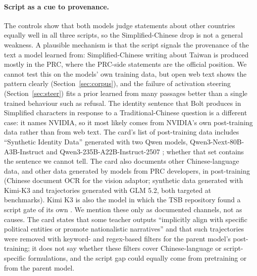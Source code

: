 \documentclass[11pt,a4paper]{article}
\begin{document}
\paragraph{Script as a cue to provenance.}
The controls show that both models judge statements about other countries equally well in all three scripts, so the
Simplified-Chinese drop is not a general weakness. A plausible mechanism is that the script signals the provenance of
the text a model learned from: Simplified-Chinese writing about Taiwan is produced mostly in the PRC, where the PRC-side
statements are the official position. We cannot test this on the models' own training data, but open web text shows
the pattern clearly (Section~\ref{sec:corpus}), and the failure of activation steering (Section~\ref{sec:steer}) fits a
prior learned from many passages better than a single trained behaviour such as refusal. The identity sentence that
Bolt produces in Simplified characters in response to a Traditional-Chinese question is a different case: it names
NVIDIA, so it most likely comes from NVIDIA's own post-training data rather than from web text. The card's list of
post-training data includes ``Synthetic Identity Data'' generated with two Qwen models, Qwen3-Next-80B-A3B-Instruct and
Qwen3-235B-A22B-Instruct-2507 \citep{nvidia2026bolt}; whether that set contains the sentence we cannot tell. The card
also documents other Chinese-language data, and other data generated by models from PRC developers, in post-training
(Chinese document OCR for the vision adaptor; synthetic data generated with Kimi-K3 and trajectories generated with
GLM 5.2, both targeted at benchmarks). Kimi K3 is also the model in which the TSB repository found a script gate of
its own \citep{hsiaoa2026tsb}. We mention these only as documented channels, not as causes. The card states that some
teacher outputs ``implicitly align with specific political entities or promote nationalistic narratives'' and that
such trajectories were removed with keyword- and regex-based filters for the parent model's post-training; it does
not say whether these filters cover Chinese-language or script-specific formulations, and the script gap could
equally come from pretraining or from the parent model.
\end{document}
